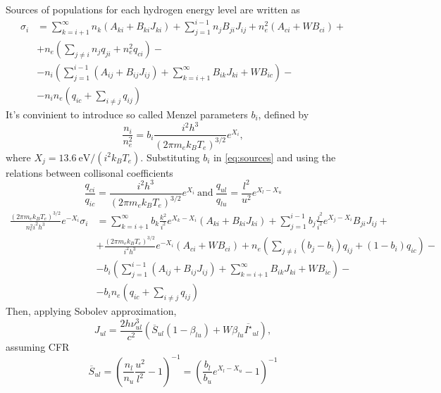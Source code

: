 \documentclass{article}
\begin{document}
Sources of populations for each hydrogen energy level are written as
\begin{equation}\label{eq:sources}
    \begin{aligned}
        \sigma_i &= \sum\limits_{k=i+1}^\infty n_k(A_{ki} + B_{ki}J_{ki}) + \sum\limits_{j=1}^{i-1} n_jB_{ji}J_{ij}+ n_e^2(A_{ci} + WB_{ci})+\\
        &+n_e\left(\sum\limits_{j\neq i}n_jq_{ji}  + n_e^2q_{ci}\right)-\\
        &-n_i\left(\sum\limits_{j=1}^{i-1}(A_{ij} + B_{ij}J_{ij}) + \sum\limits_{k=i+1}^\infty B_{ik}J_{ki} + WB_{ic}\right) -\\
        &-n_in_e\left(q_{ic} + \sum\limits_{i \neq j}q_{ij}\right)
    \end{aligned}
\end{equation}
It's convinient to introduce so called Menzel parameters \(b_i\), defined by
\begin{equation}\label{eq:menzel}
    \frac{n_i}{n_e^2} = b_i\frac{i^2h^3}{(2\pi m_ek_BT_e)^{3/2}}e^{X_i},
\end{equation}
where \(X_j = 13.6\ \mathrm{eV}/(i^2k_BT_e)\). Substituting \(b_i\) in \eqref{eq:sources} and using the relations between collisonal coefficients
\[
\frac{q_{ci}}{q_{ic}} = \frac{i^2h^3}{(2\pi m_ek_BT_e)^{3/2}}e^{X_i}\ \mathrm{and}\  \frac{q_{ul}}{q_{lu}} = \frac{l^2}{u^2}e^{X_l - X_u}
\]
\begin{equation}
    \begin{aligned}
        \frac{(2\pi m_ek_BT_e)^{3/2}}{n_e^2i^2h^3}e^{-X_i}\sigma_i &= \sum\limits_{k=i+1}^\infty b_k\frac{k^2}{i^2}e^{X_k-X_i}(A_{ki} + B_{ki}J_{ki}) + \sum\limits_{j=1}^{i-1} b_j\frac{j^2}{i^2}e^{X_j-X_i}B_{ji}J_{ij} +\\
        &+\frac{(2\pi m_ek_BT_e)^{3/2}}{i^2h^3}e^{-X_i}(A_{ci} + WB_{ci}) +n_e\left(\sum\limits_{j \neq i}(b_j-b_i)q_{ij}  + (1-b_i)q_{ic}\right)-\\
        &-b_i\left(\sum\limits_{j=1}^{i-1}(A_{ij} + B_{ij}J_{ij}) + \sum\limits_{k=i+1}^\infty B_{ik}J_{ki} + WB_{ic}\right) -\\
        &-b_in_e\left(q_{ic} + \sum\limits_{i \neq j}q_{ij}\right)
    \end{aligned}
\end{equation}
Then, applying Sobolev approximation,
\[
J_{ul} = \frac{2h\nu_{ul}^3}{c^2}\left(\overline{S}_{ul}(1-\beta_{lu}) + W\beta_{lu} \overline{I^\star}_{ul}\right),
\]
assuming CFR
\[
\overline{S}_{ul} = \left(\frac{n_l}{n_u}\frac{u^2}{l^2} - 1\right)^{-1} = \left(\frac{b_l}{b_u}e^{X_l-X_u} - 1\right)^{-1}
\]
\end{document}

